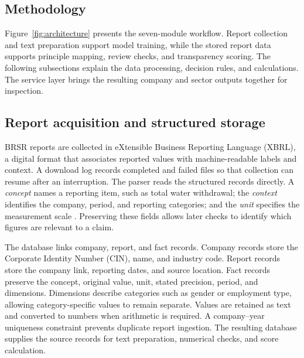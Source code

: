 \par\clearpage
\begin{lrbox}{\methodologyoverviewbox}
\begin{minipage}{\linewidth}
\section{Methodology}
\label{sec:methodology}

Figure~\ref{fig:architecture} presents the seven-module workflow. Report collection and text preparation support model training, while the stored report data supports principle mapping, review checks, and transparency scoring. The following subsections explain the data processing, decision rules, and calculations. The service layer brings the resulting company and sector outputs together for inspection.


\end{minipage}
\end{lrbox}
\ifdim\dimexpr\ht\methodologyoverviewbox+\dp\methodologyoverviewbox\relax>\textheight
\PackageError{GRASP-layout}{Methodology overview exceeds one page}{Reduce the diagram height.}
\fi
\noindent\usebox{\methodologyoverviewbox}
\par\clearpage

\subsection{Report acquisition and structured storage}
\label{sec:ingestion}

BRSR reports are collected in eXtensible Business Reporting Language (XBRL), a digital format that associates reported values with machine-readable labels and context. A download log records completed and failed files so that collection can resume after an interruption. The parser reads the structured records directly. A \emph{concept} names a reporting item, such as total water withdrawal; the \emph{context} identifies the company, period, and reporting categories; and the \emph{unit} specifies the measurement scale \cite{xbrl2013}. Preserving these fields allows later checks to identify which figures are relevant to a claim.

The database links company, report, and fact records. Company records store the Corporate Identity Number (CIN), name, and industry code. Report records store the company link, reporting dates, and source location. Fact records preserve the concept, original value, unit, stated precision, period, and dimensions. Dimensions describe categories such as gender or employment type, allowing category-specific values to remain separate. Values are retained as text and converted to numbers when arithmetic is required. A company--year uniqueness constraint prevents duplicate report ingestion. The resulting database supplies the source records for text preparation, numerical checks, and score calculation.

